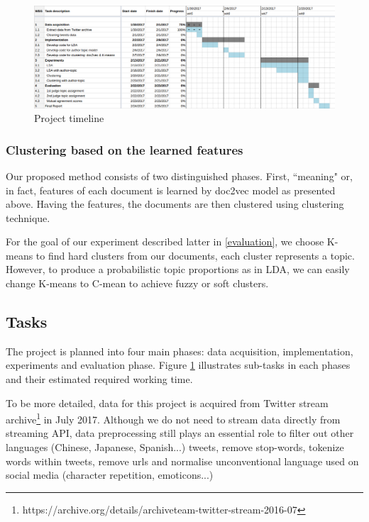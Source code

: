 \documentclass[conference,compsoc]{IEEEtran}
\begin{document}
\begin{figure}[tb]
	\centering
	\includegraphics[width=\textwidth]{project_timeline}
	\caption{Project timeline}
	\label{fig:project_timeline}
\end{figure}

\subsubsection{Clustering based on the learned features}
Our proposed method consists of two distinguished phases. First, ``meaning" or, in fact, features of each document is learned by doc2vec model as presented above. Having the features, the documents are then clustered using clustering technique. 

For the goal of our experiment described latter in \ref{evaluation}, we choose K-means to find hard clusters from our documents, each cluster represents a topic. However, to produce a probabilistic topic proportions as in LDA, we can easily change K-means to C-mean to achieve fuzzy or soft clusters.

\subsection{Tasks} \label{tasks}

The project is planned into four main phases: data acquisition, implementation, experiments and evaluation phase. Figure \ref{fig:project_timeline} illustrates sub-tasks in each phases and their estimated required working time.


To be more detailed, data for this project is acquired from Twitter stream archive\footnote{https://archive.org/details/archiveteam-twitter-stream-2016-07} in July 2017. Although we do not need to stream data directly from streaming API, data preprocessing still plays an essential role to filter out other languages (Chinese, Japanese, Spanish...) tweets, remove stop-words, tokenize words within tweets, remove urls and normalise unconventional language used on social media (character repetition, emoticons...)
\end{document}
